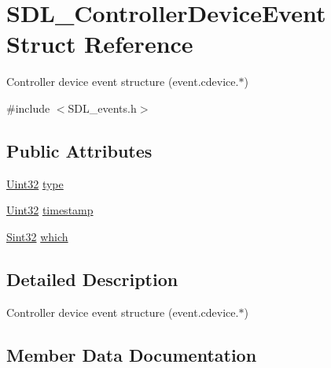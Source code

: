 \hypertarget{struct_s_d_l___controller_device_event}{}\section{S\+D\+L\+\_\+\+Controller\+Device\+Event Struct Reference}
\label{struct_s_d_l___controller_device_event}


Controller device event structure (event.\+cdevice.$\ast$)  




{\ttfamily \#include $<$S\+D\+L\+\_\+events.\+h$>$}

\subsection*{Public Attributes}
\begin{DoxyCompactItemize}
\item 
\mbox{\hyperlink{_s_d_l__stdinc_8h_add440eff171ea5f55cb00c4a9ab8672d}{Uint32}} \mbox{\hyperlink{struct_s_d_l___controller_device_event_a45b3807eaf70a5f5cf712455da277536}{type}}
\item 
\mbox{\hyperlink{_s_d_l__stdinc_8h_add440eff171ea5f55cb00c4a9ab8672d}{Uint32}} \mbox{\hyperlink{struct_s_d_l___controller_device_event_a62945795fc17f5000fddc80e2cf921b8}{timestamp}}
\item 
\mbox{\hyperlink{_s_d_l__stdinc_8h_a7a90b941db9d4582e9ad7abb9940ff7e}{Sint32}} \mbox{\hyperlink{struct_s_d_l___controller_device_event_accb80de1619c1e790cffb6c888c915db}{which}}
\end{DoxyCompactItemize}


\subsection{Detailed Description}
Controller device event structure (event.\+cdevice.$\ast$) 

\subsection{Member Data Documentation}
\mbox{\label{struct_s_d_l___controller_device_event_a62945795fc17f5000fddc80e2cf921b8}} 
